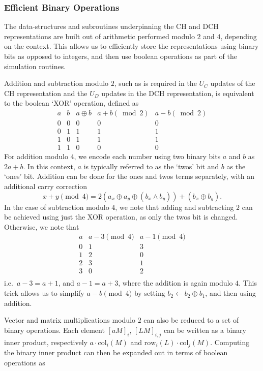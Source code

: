 \subsubsection*{Efficient Binary Operations}\label{sec:binary_ops}
The data-structures and subroutines underpinning the CH and DCH representations are built out of arithmetic performed modulo $2$ and $4$, depending on the context. This allows us to efficiently store the representations using binary bits as opposed to integers, and then use boolean operations as part of the simulation routines.\par
Addition and subtraction modulo $2$, such as is required in the $U_{C}$ updates of the CH representation and the $U_{D}$ updates in the DCH representation, is equivalent to the boolean `XOR' operation, defined as
\[
\begin{array}{c|c|c|c|c}
a & b & a\oplus b & a+b\left(\bmod{2}\right)&a-b\left(\bmod{2}\right)\\
\hline
0 & 0 & 0 & 0 & 0\\
0 & 1 & 1  & 1 & 1\\
1 & 0 & 1 & 1 & 1\\
1 & 1 & 0 & 0 & 0
\end{array}
\label{eq:xor}
\]
For addition modulo $4$, we encode each number using two binary bits $a$ and $b$ as $2a+b$. In this context, $a$ is typically referred to as the `twos' bit and $b$ as the `ones' bit. Addition can be done for the ones and twos terms separately, with an additional carry correction
\[x+y\pmod{4} = 2\left(a_{x}\oplus a_{y} \oplus (b_{x}\wedge b_{y})\right) + \left(b_{x}\oplus b_{y}\right).\]
In the case of subtraction modulo $4$, we note that adding and subtracting $2$ can be achieved using just the XOR operation, as only the twos bit is changed. Otherwise, we note that
\[
\begin{array}{c|c|c}
a  & a-3 \pmod{4} & a-1\pmod{4}\\
\hline
0 & 1 & 3 \\
1 & 2 & 0 \\
2 & 3 & 1 \\
3 & 0 & 2 \\
\end{array}
\]
i.e.\ $a-3=a+1$, and $a-1=a+3$, where the addition is again modulo $4$. This trick allows us to simplify $a-b\pmod{4}$ by setting $b_{2}\gets b_{2}\oplus b_{1}$, and then using addition.\par
Vector and matrix multiplications modulo $2$ can also be reduced to a set of binary operations. Each element $[aM]_{i}$, $[LM]_{i,j}$ can be written as a binary inner product, respectively $a\cdot \text{col}_{i}(M)$ and $\text{row}_{i}(L)\cdot\text{col}_{j}(M)$. Computing the binary inner product can then be expanded out in terms of boolean operations as
